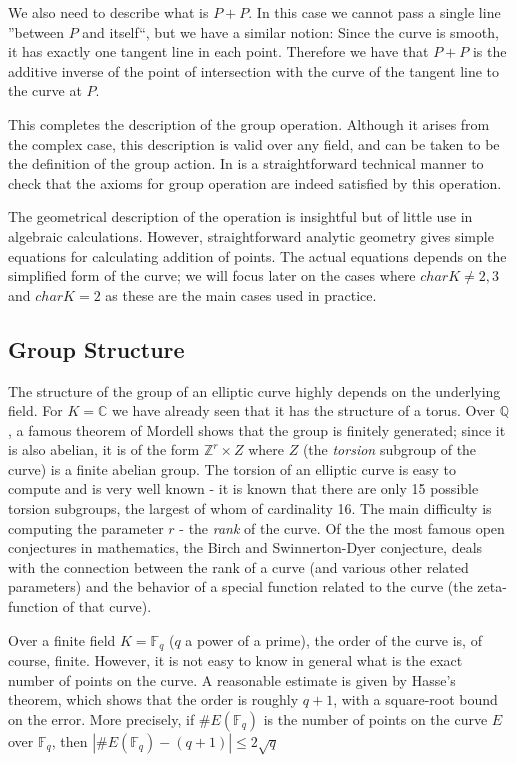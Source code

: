 \documentclass[11pt,english]{article}
\begin{document}
We also need to describe what is $P+P$. In this case we cannot pass a single line ''between $P$ and itself``, but we have a similar notion: Since the curve is smooth,
it has exactly one tangent line in each point. Therefore we have that $P+P$ is the additive inverse of the point of intersection with the curve of the tangent line to the curve at $P$.

This completes the description of the group operation. Although it arises from the complex case, this description is valid over any field, and can be taken to be
the definition of the group action. In is a straightforward technical manner to check that the axioms for group operation are indeed satisfied by this operation.

The geometrical description of the operation is insightful but of little use in algebraic calculations. However, straightforward analytic geometry
gives simple equations for calculating addition of points. The actual equations depends on the simplified form of the curve; we will focus later on the cases
where $charK\ne 2,3$ and $charK=2$ as these are the main cases used in practice.

\subsection{Group Structure}
The structure of the group of an elliptic curve highly depends on the underlying field. For $K=\mathbb{C}$ we have already seen that it has the structure of a torus.
Over $\mathbb{Q}$, a famous theorem of Mordell shows that the group is finitely generated; since it is also abelian, it is of the form $\mathbb{Z}^r\times Z$
where $Z$ (the \emph{torsion} subgroup of the curve) is a finite abelian group. The torsion of an elliptic curve is easy to compute and is very well known -
it is known that there are only 15 possible torsion subgroups, the largest of whom of cardinality 16. The main difficulty is computing the parameter
$r$ - the \emph{rank} of the curve. Of the the most famous open conjectures in mathematics, the Birch and Swinnerton-Dyer conjecture, deals
with the connection between the rank of a curve (and various other related parameters) and the behavior of a special function related to the curve (the
zeta-function of that curve).

Over a finite field $K=\mathbb{F}_q$ ($q$ a power of a prime), the order of the curve is, of course, finite. However, it is not easy to know in general
what is the exact number of points on the curve.  A reasonable estimate is given by Hasse's theorem, which shows that the order is roughly $q+1$, with
a square-root bound on the error. More precisely, if $\#E(\mathbb{F}_q)$ is the number of points on the curve $E$ over $\mathbb{F}_q$, then 
$|\#E(\mathbb{F}_q)-(q+1)|\le 2\sqrt{q}$
\end{document}
